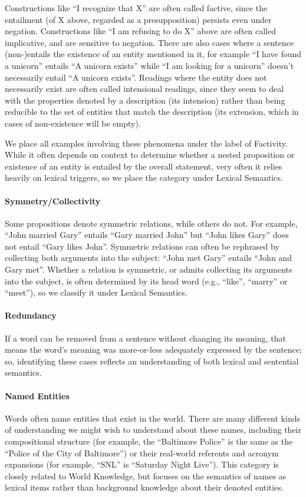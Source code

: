 \documentclass{article} \usepackage{iclr2019_conference,times}
\begin{document}
Constructions like ``I recognize that X'' are often called factive, since the entailment (of X above, regarded as a presupposition) persists even under negation. Constructions like ``I am refusing to do X'' above are often called implicative, and are sensitive to negation. There are also cases where a sentence (non-)entails the existence of an entity mentioned in it, for example ``I have found a unicorn'' entails ``A unicorn exists'' while ``I am looking for a unicorn'' doesn't necessarily entail ``A unicorn exists''. Readings where the entity does not necessarily exist are often called intensional readings, since they seem to deal with the properties denoted by a description (its intension) rather than being reducible to the set of entities that match the description (its extension, which in cases of non-existence will be empty).

We place all examples involving these phenomena under the label of Factivity. While it often depends on context to determine whether a nested proposition or existence of an entity is entailed by the overall statement, very often it relies heavily on lexical triggers, so we place the category under Lexical Semantics.

\paragraph{Symmetry/Collectivity} Some propositions denote symmetric relations, while others do not. For example, ``John married Gary'' entails ``Gary married John'' but ``John likes Gary'' does not entail ``Gary likes John''. Symmetric relations can often be rephrased by collecting both arguments into the subject: ``John met Gary'' entails ``John and Gary met''. Whether a relation is symmetric, or admits collecting its arguments into the subject, is often determined by its head word (e.g., ``like'', ``marry'' or ``meet''), so we classify it under Lexical Semantics.

\paragraph{Redundancy} If a word can be removed from a sentence without changing its meaning, that means the word's meaning was more-or-less adequately expressed by the sentence; so, identifying these cases reflects an understanding of both lexical and sentential semantics.

\paragraph{Named Entities} Words often name entities that exist in the world. There are many different kinds of understanding we might wish to understand about these names, including their compositional structure (for example, the ``Baltimore Police'' is the same as the ``Police of the City of Baltimore'') or their real-world referents and acronym expansions (for example, ``SNL'' is ``Saturday Night Live''). This category is closely related to World Knowledge, but focuses on the semantics of names as lexical items rather than background knowledge about their denoted entities.
\end{document}
